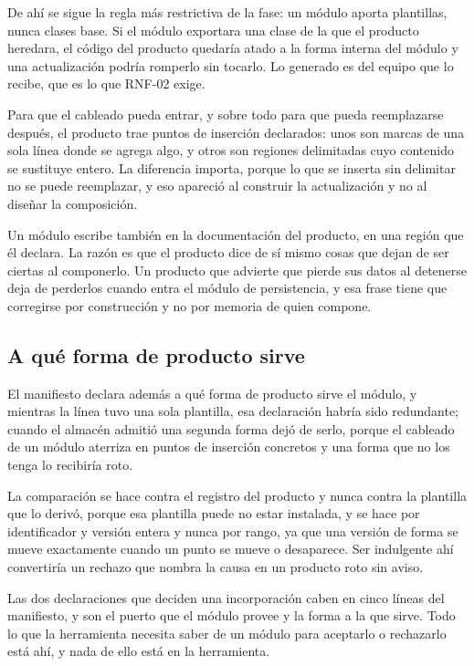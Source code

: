 De ahí se sigue la regla más restrictiva de la fase: un módulo aporta
plantillas, nunca clases base. Si el módulo exportara una clase de
la que el producto heredara, el código del producto quedaría atado a la forma
interna del módulo y una actualización podría romperlo sin tocarlo. Lo
generado es del equipo que lo recibe, que es lo que RNF-02 exige.

Para que el cableado pueda entrar, y sobre todo para que pueda reemplazarse
después, el producto trae puntos de inserción declarados: unos son marcas de
una sola línea donde se agrega algo, y otros son regiones delimitadas cuyo
contenido se sustituye entero. La diferencia importa, porque lo que se
inserta sin delimitar no se puede reemplazar, y eso apareció al construir la
actualización y no al diseñar la composición.

Un módulo escribe también en la documentación del producto, en una región que
él declara. La razón es que el producto dice de sí mismo cosas que dejan de
ser ciertas al componerlo. Un producto que advierte que pierde sus datos al
detenerse deja de perderlos cuando entra el módulo de persistencia, y esa
frase tiene que corregirse por construcción y no por memoria de quien compone.

\subsection{A qué forma de producto sirve}

El manifiesto declara además a qué forma de producto sirve el módulo, y
mientras la línea tuvo una sola plantilla, esa declaración habría sido
redundante; cuando el almacén admitió una segunda forma dejó de serlo, porque
el cableado de un módulo aterriza en puntos de inserción concretos y una
forma que no los tenga lo recibiría roto.

La comparación se hace contra el registro del producto y nunca contra la
plantilla que lo derivó, porque esa plantilla puede no estar instalada, y se
hace por identificador y versión entera y nunca por rango, ya que una versión
de forma se mueve exactamente cuando un punto se mueve o desaparece. Ser
indulgente ahí convertiría un rechazo que nombra la causa en un producto roto
sin aviso.

Las dos declaraciones que deciden una incorporación caben en cinco líneas del
manifiesto, y son el puerto que el módulo provee y la forma a la que sirve.
Todo lo que la herramienta necesita saber de un módulo para aceptarlo o
rechazarlo está ahí, y nada de ello está en la herramienta.

